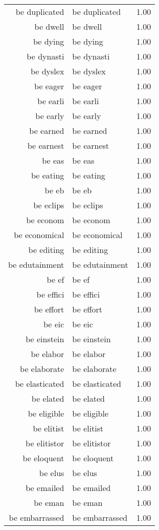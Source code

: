 \begin{table}[ht]
\begin{tabular}{rlr}
  be duplicated & be duplicated & 1.00 \\ 
  be dwell & be dwell & 1.00 \\ 
  be dying & be dying & 1.00 \\ 
  be dynasti & be dynasti & 1.00 \\ 
  be dyslex & be dyslex & 1.00 \\ 
  be eager & be eager & 1.00 \\ 
  be earli & be earli & 1.00 \\ 
  be early & be early & 1.00 \\ 
  be earned & be earned & 1.00 \\ 
  be earnest & be earnest & 1.00 \\ 
  be eas & be eas & 1.00 \\ 
  be eating & be eating & 1.00 \\ 
  be eb & be eb & 1.00 \\ 
  be eclips & be eclips & 1.00 \\ 
  be econom & be econom & 1.00 \\ 
  be economical & be economical & 1.00 \\ 
  be editing & be editing & 1.00 \\ 
  be edutainment & be edutainment & 1.00 \\ 
  be ef & be ef & 1.00 \\ 
  be effici & be effici & 1.00 \\ 
  be effort & be effort & 1.00 \\ 
  be eic & be eic & 1.00 \\ 
  be einstein & be einstein & 1.00 \\ 
  be elabor & be elabor & 1.00 \\ 
  be elaborate & be elaborate & 1.00 \\ 
  be elasticated & be elasticated & 1.00 \\ 
  be elated & be elated & 1.00 \\ 
  be eligible & be eligible & 1.00 \\ 
  be elitist & be elitist & 1.00 \\ 
  be elitistor & be elitistor & 1.00 \\ 
  be eloquent & be eloquent & 1.00 \\ 
  be elus & be elus & 1.00 \\ 
  be emailed & be emailed & 1.00 \\ 
  be eman & be eman & 1.00 \\ 
  be embarrassed & be embarrassed & 1.00 \\ 

\end{tabular}
\end{table}
